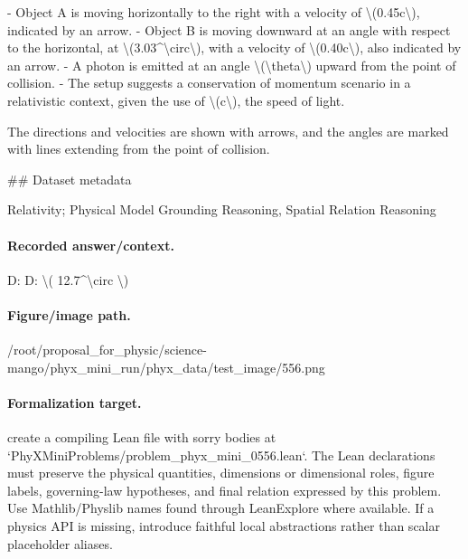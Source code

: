 - Object A is moving horizontally to the right with a velocity of \textbackslash{}(0.45c\textbackslash{}), indicated by an arrow.
- Object B is moving downward at an angle with respect to the horizontal, at \textbackslash{}(3.03\textasciicircum{}\textbackslash{}circ\textbackslash{}), with a velocity of \textbackslash{}(0.40c\textbackslash{}), also indicated by an arrow.
- A photon is emitted at an angle \textbackslash{}(\textbackslash{}theta\textbackslash{}) upward from the point of collision.
- The setup suggests a conservation of momentum scenario in a relativistic context, given the use of \textbackslash{}(c\textbackslash{}), the speed of light.

The directions and velocities are shown with arrows, and the angles are marked with lines extending from the point of collision.

\#\# Dataset metadata

Relativity; Physical Model Grounding Reasoning, Spatial Relation Reasoning

\paragraph{Recorded answer/context.}
D: D: \textbackslash{}( 12.7\textasciicircum{}\textbackslash{}circ \textbackslash{})

\paragraph{Figure/image path.}
/root/proposal\_for\_physic/science-mango/phyx\_mini\_run/phyx\_data/test\_image/556.png

\paragraph{Formalization target.}
create a compiling Lean file with sorry bodies at `PhyXMiniProblems/problem\_phyx\_mini\_0556.lean`. The Lean declarations must preserve the physical quantities, dimensions or dimensional roles, figure labels, governing-law hypotheses, and final relation expressed by this problem.
Use Mathlib/Physlib names found through LeanExplore where available. If a physics API is missing, introduce faithful local abstractions rather than scalar placeholder aliases.

